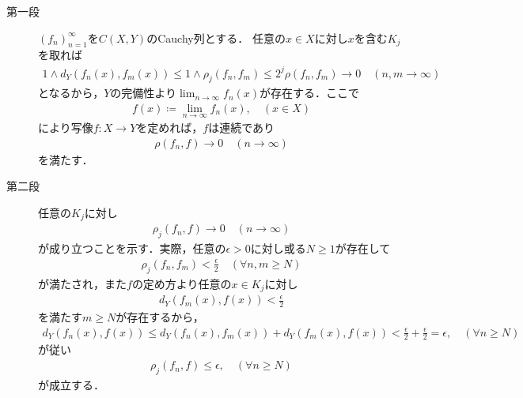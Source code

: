 	\begin{prf}\mbox{}
		\begin{description}
			\item[第一段]
				$(f_n)_{n=1}^\infty$を$C(X,Y)$のCauchy列とする．
				任意の$x \in X$に対し$x$を含む$K_j$を取れば
				\begin{align}
					1 \wedge d_Y(f_n(x),f_m(x)) 
					\leq 1 \wedge \rho_j(f_n,f_m)
					\leq 2^j \rho(f_n,f_m) \longrightarrow 0
					\quad (n,m \longrightarrow \infty)
				\end{align}
				となるから，$Y$の完備性より$\lim_{n \to \infty} f_n(x)$が存在する．ここで
				\begin{align}
					f(x) \coloneqq \lim_{n \to \infty} f_n(x), \quad (x \in X)
				\end{align}
				により写像$f:X \longrightarrow Y$を定めれば，$f$は連続であり
				\begin{align}
					\rho(f_n,f) \longrightarrow 0 \quad (n \longrightarrow \infty)
					\label{eq:completeness_and_separability_of_space_of_continuous_functions_3}
				\end{align}
				を満たす．
			
			\item[第二段]
				任意の$K_j$に対し
				\begin{align}
					\rho_j(f_n,f) \longrightarrow 0
					\quad (n \longrightarrow \infty)
					\label{eq:completeness_and_separability_of_space_of_continuous_functions_4}
				\end{align}
				が成り立つことを示す．実際，任意の$\epsilon > 0$に対し或る$N \geq 1$が存在して
				\begin{align}
					\rho_j(f_n,f_m) < \frac{\epsilon}{2}
					\quad (\forall n,m \geq N)
				\end{align}
				が満たされ，また$f$の定め方より任意の$x \in K_j$に対し
				\begin{align}
					d_Y(f_m(x),f(x)) < \frac{\epsilon}{2}
				\end{align}
				を満たす$m \geq N$が存在するから，
				\begin{align}
					d_Y(f_n(x),f(x)) \leq d_Y(f_n(x),f_m(x)) + d_Y(f_m(x),f(x)) 
					< \frac{\epsilon}{2} + \frac{\epsilon}{2}
					= \epsilon,
					\quad (\forall n \geq N)
				\end{align}
				が従い
				\begin{align}
					\rho_j(f_n,f) \leq \epsilon,
					\quad (\forall n \geq N)
				\end{align}
				が成立する．
				

\end{description}
\end{prf}
